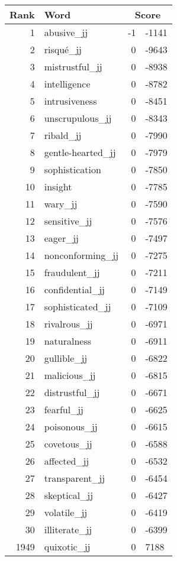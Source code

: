 \begin{longtable}[!htbp]{| rlr@{.}l |}
    \hline
    \textbf{Rank} & \textbf{Word} & \multicolumn{2}{c|}{\textbf{Score}} \\
    \hline
    \endhead
    1 & abusive\_jj & -1 & -1141 \\
    2 & risqué\_jj & 0 & -9643 \\
    3 & mistrustful\_jj & 0 & -8938 \\
    4 & intelligence & 0 & -8782 \\
    5 & intrusiveness & 0 & -8451 \\
    6 & unscrupulous\_jj & 0 & -8343 \\
    7 & ribald\_jj & 0 & -7990 \\
    8 & gentle-hearted\_jj & 0 & -7979 \\
    9 & sophistication & 0 & -7850 \\
    10 & insight & 0 & -7785 \\
    11 & wary\_jj & 0 & -7590 \\
    12 & sensitive\_jj & 0 & -7576 \\
    13 & eager\_jj & 0 & -7497 \\
    14 & nonconforming\_jj & 0 & -7275 \\
    15 & fraudulent\_jj & 0 & -7211 \\
    16 & confidential\_jj & 0 & -7149 \\
    17 & sophisticated\_jj & 0 & -7109 \\
    18 & rivalrous\_jj & 0 & -6971 \\
    19 & naturalness & 0 & -6911 \\
    20 & gullible\_jj & 0 & -6822 \\
    21 & malicious\_jj & 0 & -6815 \\
    22 & distrustful\_jj & 0 & -6671 \\
    23 & fearful\_jj & 0 & -6625 \\
    24 & poisonous\_jj & 0 & -6615 \\
    25 & covetous\_jj & 0 & -6588 \\
    26 & affected\_jj & 0 & -6532 \\
    27 & transparent\_jj & 0 & -6454 \\
    28 & skeptical\_jj & 0 & -6427 \\
    29 & volatile\_jj & 0 & -6419 \\
    30 & illiterate\_jj & 0 & -6399 \\
    1949 & quixotic\_jj & 0 & 7188 \\

\end{longtable}
